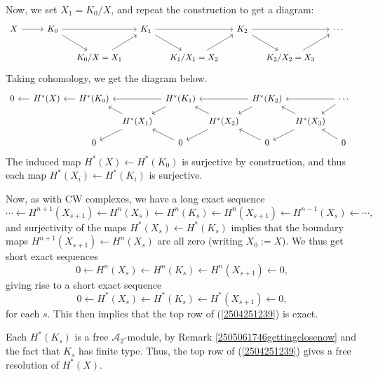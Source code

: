 \documentclass[11pt, titlepage]{article} %
\def\A{\ensuremath{\mathscr{A}_2}}
\numberwithin{equation}{subsection}
\theoremstyle{plain}
\theoremstyle{definition}
\begin{document}
Now, we set \(X_1=K_0/X\), and repeat the construction to get a diagram:
\begin{equation}\label{2503301114}
\begin{tikzcd}[column sep=3ex, row sep=4ex] 
 X \arrow[rr, ""]  & & K_0 \arrow[rr, ""] \arrow[dr, ""] & & K_1 \arrow[dr, ""] \arrow[rr, ""] & & K_2 \arrow[dr, ""] \arrow[rr, ""] & & \cdots \\ 
  &&& K_0/X=X_1 \arrow[ur, ""] & & K_1/X_1=X_2 \arrow[ur, ""] & & K_2/X_2=X_3 \arrow[ur, ""] &  &
 \end{tikzcd}\nonumber
\end{equation}
Taking cohomology, we get the diagram below.
\begin{equation}\label{2504251239}
\begin{tikzcd}[column sep=1.5ex, row sep = 2ex, arrows=<-]
 0 \arrow[rr, ""] && H^*(X) \arrow[rr,""] & & H^*(K_0) \arrow[rr, ""] \arrow[dr, ""] & & H^*(K_1) \arrow[dr, ""] \arrow[rr, ""] & & H^*(K_2) \arrow[dr, ""] \arrow[rr, ""] & & \cdots \\ 
  &&&&& H^*(X_1) \arrow[ur, ""] \arrow[dr] & & H^*(X_2) \arrow[ur, ""] \arrow[dr] & & H^*(X_3) \arrow[ur, ""] \arrow[dr] &  &\\
&&&& 0 \arrow[ur] && 0 \arrow[ur] && 0 \arrow[ur] && 0
 \end{tikzcd}
\end{equation}
The induced map \(H^*(X)\leftarrow H^*(K_0)\) is surjective by construction, and thus each map \(H^*(X_i)\leftarrow H^*(K_i)\) is surjective. 

Now, as with CW complexes, we have a long exact sequence
\[\cdots \leftarrow H^{n+1}(X_{s+1})\leftarrow H^n(X_{s})\leftarrow H^n(K_s)\leftarrow H^n(X_{s+1})\leftarrow H^{n-1}(X_s)\leftarrow \cdots,\]
and surjectivity of the maps \(H^*(X_s)\leftarrow H^*(K_s)\) implies that the boundary maps \(H^{n+1}(X_{s+1})\leftarrow H^n(X_s)\) are all zero (writing \(X_0:=X\)). We thus get short exact sequences
\[0\leftarrow H^n(X_{s})\leftarrow H^n(K_s)\leftarrow H^n(X_{s+1})\leftarrow0,\]
giving rise to a short exact sequence
\[0\leftarrow H^*(X_{s})\leftarrow H^*(K_s)\leftarrow H^*(X_{s+1})\leftarrow0,\]
for each \(s\). This then implies that the top row of (\ref{2504251239}) is exact.

Each \(H^*(K_s)\) is a free \(\A\)-module, by Remark \ref{2505061746gettingclosenow} and the fact that \(K_s\) has finite type. Thus, the top row of (\ref{2504251239}) gives a free resolution of \(H^*(X)\). 
\end{document}
